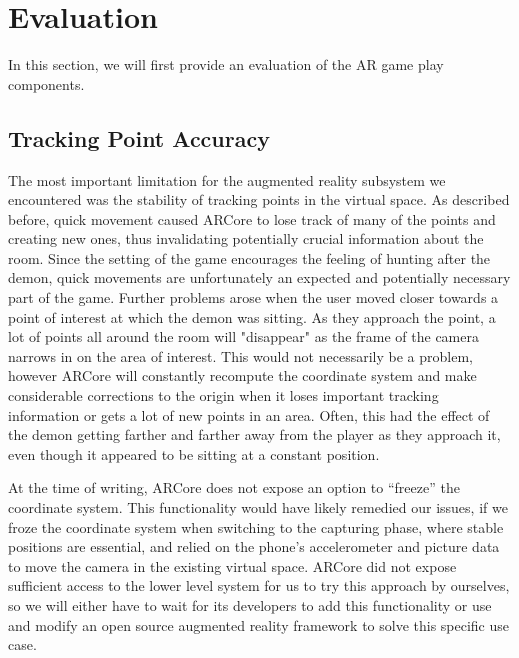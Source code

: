 \section{Evaluation}
\label{sec:evaluation}

In this section, we will first provide an evaluation of the AR game play components.

\subsection{Tracking Point Accuracy}
The most important limitation for the augmented reality subsystem we encountered was the stability of tracking points in the virtual space.
As described before, quick movement caused ARCore to lose track of many of the points and creating new ones, thus invalidating potentially crucial information about the room.
Since the setting of the game encourages the feeling of hunting after the demon, quick movements are unfortunately an expected and potentially necessary part of the game.
Further problems arose when the user moved closer towards a point of interest at which the demon was sitting.
As they approach the point, a lot of points all around the room will "disappear" as the frame of the camera narrows in on the area of interest.
This would not necessarily be a problem, however ARCore will constantly recompute the coordinate system and make considerable corrections to the origin when it loses important tracking information or gets a lot of new points in an area.
Often, this had the effect of the demon getting farther and farther away from the player as they approach it, even though it appeared to be sitting at a constant position.

At the time of writing, ARCore does not expose an option to \enquote{freeze} the coordinate system.
This functionality would have likely remedied our issues, if we froze the coordinate system when switching to the capturing phase, where stable positions are essential, and relied on the phone's accelerometer and picture data to move the camera in the existing virtual space.
ARCore did not expose sufficient access to the lower level system for us to try this approach by ourselves, so we will either have to wait for its developers to add this functionality or use and modify an open source augmented reality framework to solve this specific use case.

